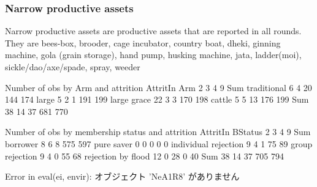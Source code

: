 \subsubsection{Narrow productive assets}


Narrow productive assets are productive assets that are reported in all rounds. They are bees-box, brooder, cage incubator, country boat, dheki, ginning machine, gola (grain storage), hand pump, husking machine, jata, ladder(moi), sickle/dao/axe/spade, spray, weeder



\begin{Schunk}
\begin{Soutput}


Number of obs by Arm and attrition
             AttritIn
Arm             2   3   4   9 Sum
  traditional   6   4  20 144 174
  large         5   2   1 191 199
  large grace  22   3   3 170 198
  cattle        5   5  13 176 199
  Sum          38  14  37 681 770


Number of obs by membership status and attrition
                      AttritIn
BStatus                  2   3   4   9 Sum
  borrower               8   6   8 575 597
  pure saver             0   0   0   0   0
  individual rejection   9   4   1  75  89
  group rejection        9   4   0  55  68
  rejection by flood    12   0  28   0  40
  Sum                   38  14  37 705 794
\end{Soutput}
\begin{Soutput}
Error in eval(ei, envir):  オブジェクト 'NeA1R8' がありません 
\end{Soutput}
\end{Schunk}




